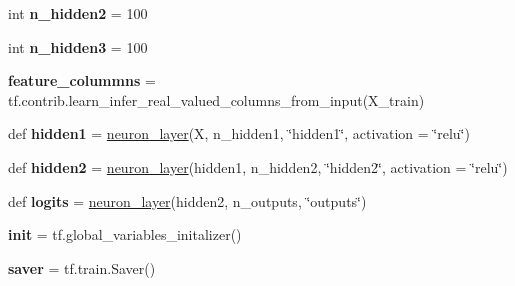 \begin{DoxyCompactItemize}
int {\bfseries n\+\_\+hidden2} = 100
\item 
\mbox{\label{namespacechemistry2quant_1_1chem2quant__analysis_a892749c0643a074cbfe4c740cf958a44}} 
int {\bfseries n\+\_\+hidden3} = 100
\item 
\mbox{\label{namespacechemistry2quant_1_1chem2quant__analysis_a5aea0d4e1c6fbf74d540809ab32cb821}} 
{\bfseries feature\+\_\+colummns} = tf.\+contrib.\+learn\+\_\+infer\+\_\+real\+\_\+valued\+\_\+columns\+\_\+from\+\_\+input(X\+\_\+train)
\item 
\mbox{\label{namespacechemistry2quant_1_1chem2quant__analysis_a96f8355fe78c70265e0b51b533ca9567}} 
def {\bfseries hidden1} = \hyperlink{namespacechemistry2quant_1_1chem2quant__analysis_af45b049d6a04c87f9f473f3356dda58c}{neuron\+\_\+layer}(X, n\+\_\+hidden1, \char`\"{}hidden1\char`\"{}, activation = \char`\"{}relu\char`\"{})
\item 
\mbox{\label{namespacechemistry2quant_1_1chem2quant__analysis_a36b629c603687948067d5de7b94d4d82}} 
def {\bfseries hidden2} = \hyperlink{namespacechemistry2quant_1_1chem2quant__analysis_af45b049d6a04c87f9f473f3356dda58c}{neuron\+\_\+layer}(hidden1, n\+\_\+hidden2, \char`\"{}hidden2\char`\"{}, activation = \char`\"{}relu\char`\"{})
\item 
\mbox{\label{namespacechemistry2quant_1_1chem2quant__analysis_a643325fa63e35ef454fd7104ed405b9a}} 
def {\bfseries logits} = \hyperlink{namespacechemistry2quant_1_1chem2quant__analysis_af45b049d6a04c87f9f473f3356dda58c}{neuron\+\_\+layer}(hidden2, n\+\_\+outputs, \char`\"{}outputs\char`\"{})
\item 
\mbox{\label{namespacechemistry2quant_1_1chem2quant__analysis_adf0eae946dfb0878ef93535ee235a05e}} 
{\bfseries init} = tf.\+global\+\_\+variables\+\_\+initalizer()
\item 
\mbox{\label{namespacechemistry2quant_1_1chem2quant__analysis_ad07dd3a7e649a815ed01efbbd351b3ed}} 
{\bfseries saver} = tf.\+train.\+Saver()
\end{DoxyCompactItemize}


